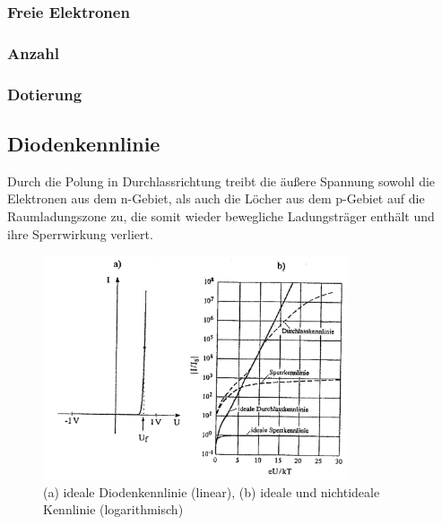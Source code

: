 	\subsubsection{Freie Elektronen}
	
	\subsubsection{Anzahl}
	\subsubsection{Dotierung}
	

	
\subsection{Diodenkennlinie }\label{k5:diode}
Durch die Polung in Durchlassrichtung treibt die äußere Spannung sowohl die Elektronen aus dem n-Gebiet, als auch die Löcher aus dem p-Gebiet auf die Raumladungszone zu, die somit wieder bewegliche Ladungsträger enthält und ihre Sperrwirkung verliert. 
    \begin{figure}[H]
        \centering
        \includegraphics[width=0.8\textwidth]{fig/diodenkennlinie}
        \caption{(a) ideale Diodenkennlinie (linear), (b) ideale und nichtideale Kennlinie (logarithmisch)}
        \label{fig:diodenkennlinie}
    \end{figure}

